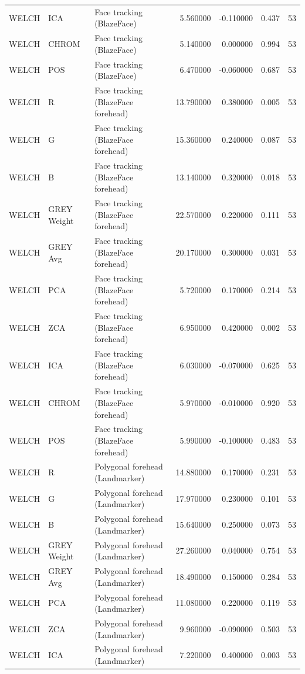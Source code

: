 \begin{table}[htbp]
\begin{tabular}{l l l r r l r}
WELCH & ICA & Face tracking (BlazeFace) & 5.560000 & -0.110000 & 0.437 & 53 \\
WELCH & CHROM & Face tracking (BlazeFace) & 5.140000 & 0.000000 & 0.994 & 53 \\
WELCH & POS & Face tracking (BlazeFace) & 6.470000 & -0.060000 & 0.687 & 53 \\
WELCH & R & Face tracking (BlazeFace forehead) & 13.790000 & 0.380000 & 0.005 & 53 \\
WELCH & G & Face tracking (BlazeFace forehead) & 15.360000 & 0.240000 & 0.087 & 53 \\
WELCH & B & Face tracking (BlazeFace forehead) & 13.140000 & 0.320000 & 0.018 & 53 \\
WELCH & GREY Weight & Face tracking (BlazeFace forehead) & 22.570000 & 0.220000 & 0.111 & 53 \\
WELCH & GREY Avg & Face tracking (BlazeFace forehead) & 20.170000 & 0.300000 & 0.031 & 53 \\
WELCH & PCA & Face tracking (BlazeFace forehead) & 5.720000 & 0.170000 & 0.214 & 53 \\
WELCH & ZCA & Face tracking (BlazeFace forehead) & 6.950000 & 0.420000 & 0.002 & 53 \\
WELCH & ICA & Face tracking (BlazeFace forehead) & 6.030000 & -0.070000 & 0.625 & 53 \\
WELCH & CHROM & Face tracking (BlazeFace forehead) & 5.970000 & -0.010000 & 0.920 & 53 \\
WELCH & POS & Face tracking (BlazeFace forehead) & 5.990000 & -0.100000 & 0.483 & 53 \\
WELCH & R & Polygonal forehead (Landmarker) & 14.880000 & 0.170000 & 0.231 & 53 \\
WELCH & G & Polygonal forehead (Landmarker) & 17.970000 & 0.230000 & 0.101 & 53 \\
WELCH & B & Polygonal forehead (Landmarker) & 15.640000 & 0.250000 & 0.073 & 53 \\
WELCH & GREY Weight & Polygonal forehead (Landmarker) & 27.260000 & 0.040000 & 0.754 & 53 \\
WELCH & GREY Avg & Polygonal forehead (Landmarker) & 18.490000 & 0.150000 & 0.284 & 53 \\
WELCH & PCA & Polygonal forehead (Landmarker) & 11.080000 & 0.220000 & 0.119 & 53 \\
WELCH & ZCA & Polygonal forehead (Landmarker) & 9.960000 & -0.090000 & 0.503 & 53 \\
WELCH & ICA & Polygonal forehead (Landmarker) & 7.220000 & 0.400000 & 0.003 & 53 \\

\end{tabular}
\end{table}
